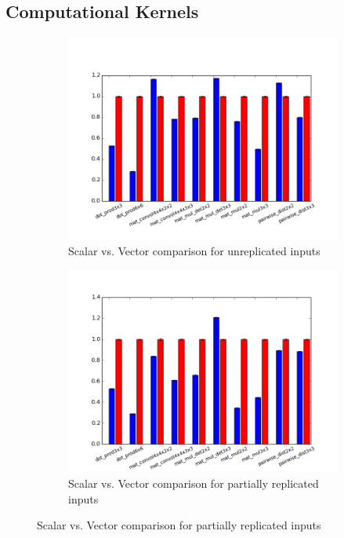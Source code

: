\subsection{Computational Kernels}
\begin{figure}
	\vspace{-4em}
    \begin{subfigure}{\linewidth}
        \includegraphics[width=1\textwidth]{figures/newAspectRatioGraphs/DataUnreplicatedENC+RUN.png}
        \vspace{-3.5em}
        \caption{Scalar vs. Vector comparison for unreplicated inputs}\label{fig:ml-kernels-unrepl}
    \end{subfigure}
    
    \vspace{-2.5em}
    
    \begin{subfigure}{\linewidth}
        \includegraphics[width=1\textwidth]{figures/newAspectRatioGraphs/DataPartiallyReplicatedENC+RUN.png}
                \vspace{-3em}
        \caption{Scalar vs. Vector comparison for partially replicated inputs}\label{fig:ml-kernels-part-repl}
    \end{subfigure}
    

\end{figure}
